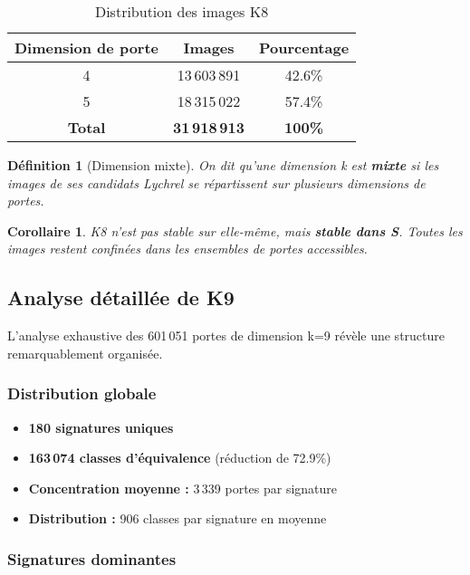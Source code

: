 \documentclass[12pt,a4paper]{article}
\newtheorem{definition}{Définition}[section]
\newtheorem{corollary}{Corollaire}[section]
\theoremstyle{remark}
\begin{document}
\begin{table}[h]
\centering
\caption{Distribution des images K8}
\begin{tabular}{ccc}
\toprule
\textbf{Dimension de porte} & \textbf{Images} & \textbf{Pourcentage}\\
\midrule
4 & 13\,603\,891 & 42.6\%\\
5 & 18\,315\,022 & 57.4\%\\
\midrule
\textbf{Total} & \textbf{31\,918\,913} & \textbf{100\%}\\
\bottomrule
\end{tabular}
\end{table}

\begin{definition}[Dimension mixte]
On dit qu'une dimension k est \textbf{mixte} si les images de ses candidats Lychrel se répartissent sur plusieurs dimensions de portes.
\end{definition}

\begin{corollary}
K8 n'est pas stable sur elle-même, mais \textbf{stable dans S}. Toutes les images restent confinées dans les ensembles de portes accessibles.
\end{corollary}

\subsection{Analyse détaillée de K9}

L'analyse exhaustive des 601\,051 portes de dimension k=9 révèle une structure remarquablement organisée.

\subsubsection{Distribution globale}

\begin{itemize}
\item \textbf{180 signatures uniques}
\item \textbf{163\,074 classes d'équivalence} (réduction de 72.9\%)
\item \textbf{Concentration moyenne :} 3\,339 portes par signature
\item \textbf{Distribution :} 906 classes par signature en moyenne
\end{itemize}

\subsubsection{Signatures dominantes}
\end{document}
